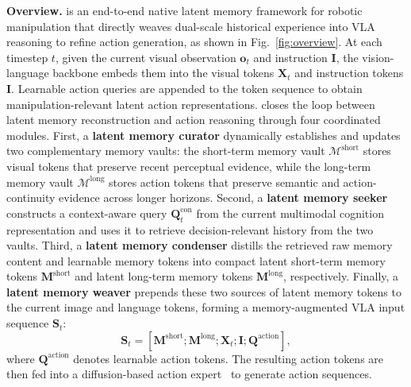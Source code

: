 \noindent\textbf{Overview.}
\ourmethod is an end-to-end native latent memory framework for robotic manipulation that directly weaves dual-scale historical experience into VLA reasoning to refine action generation, as shown in Fig.~\ref{fig:overview}.
At each timestep $t$, given the current visual observation $\bm{o}_t$ and instruction $\bm{I}$, the vision-language backbone embeds them into the visual tokens $\bm{X}_t$ and instruction tokens $\bm{I}$.
Learnable action queries are appended to the token sequence to obtain manipulation-relevant latent action representations.
\ourmethod closes the loop between latent memory reconstruction and action reasoning through four coordinated modules.
First, a \textbf{latent memory curator} dynamically establishes and updates two complementary memory vaults: the short-term memory vault $\mathcal{M}^\text{short}$ stores visual tokens that preserve recent perceptual evidence, while the long-term memory vault $\mathcal{M}^\text{long}$ stores action tokens that preserve semantic and action-continuity evidence across longer horizons.
Second, a \textbf{latent memory seeker} constructs a context-aware query $\bm{Q}_t^\text{con}$ from the current multimodal cognition representation and uses it to retrieve decision-relevant history from the two vaults.
Third, a \textbf{latent memory condenser} distills the retrieved raw memory content and learnable memory tokens into compact latent short-term memory tokens $\bm{M}^\text{short}$ and latent long-term memory tokens $\bm{M}^\text{long}$, respectively.
Finally, a \textbf{latent memory weaver} prepends these two sources of latent memory tokens to the current image and language tokens, forming a memory-augmented VLA input sequence $\bm{S}_t$:
\begin{equation}
    \label{eq:vlm_sequence_overview}
    \bm{S}_t = [\bm{M}^\text{short}; \bm{M}^\text{long}; \bm{X}_t; \bm{I}; \bm{Q}^\text{action}],
\end{equation}
where $\bm{Q}^\text{action}$ denotes learnable action tokens.
The resulting action tokens are then fed into a diffusion-based action expert~\cite{peebles2023scalable} to generate action sequences.




